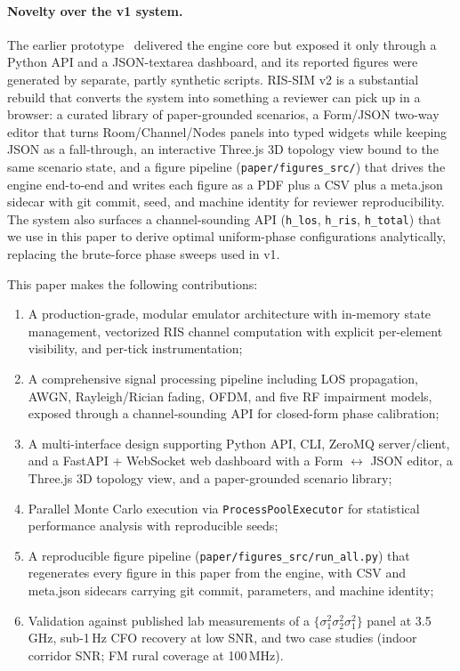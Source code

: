 \documentclass{article}
\begin{document}
\paragraph{Novelty over the v1 system.} The earlier prototype~\cite{WCL2025,NCC2025} delivered the engine core but exposed it only through a Python API and a JSON-textarea dashboard, and its reported figures were generated by separate, partly synthetic scripts. RIS-SIM v2 is a substantial rebuild that converts the system into something a reviewer can pick up in a browser: a curated library of paper-grounded scenarios, a Form/JSON two-way editor that turns Room/Channel/Nodes panels into typed widgets while keeping JSON as a fall-through, an interactive Three.js 3D topology view bound to the same scenario state, and a figure pipeline (\texttt{paper/figures\_src/}) that drives the engine end-to-end and writes each figure as a PDF plus a CSV plus a meta.json sidecar with git commit, seed, and machine identity for reviewer reproducibility. The system also surfaces a channel-sounding API (\texttt{h\_los}, \texttt{h\_ris}, \texttt{h\_total}) that we use in this paper to derive optimal uniform-phase configurations analytically, replacing the brute-force phase sweeps used in v1.

This paper makes the following contributions:
\begin{enumerate}
    \item A production-grade, modular emulator architecture with in-memory state management, vectorized RIS channel computation with explicit per-element visibility, and per-tick instrumentation;
    \item A comprehensive signal processing pipeline including LOS propagation, AWGN, Rayleigh/Rician fading, OFDM, and five RF impairment models, exposed through a channel-sounding API for closed-form phase calibration;
    \item A multi-interface design supporting Python API, CLI, ZeroMQ server/client, and a FastAPI + WebSocket web dashboard with a Form $\leftrightarrow$ JSON editor, a Three.js 3D topology view, and a paper-grounded scenario library;
    \item Parallel Monte Carlo execution via \texttt{ProcessPoolExecutor} for statistical performance analysis with reproducible seeds;
    \item A reproducible figure pipeline (\texttt{paper/figures\_src/run\_all.py}) that regenerates every figure in this paper from the engine, with CSV and meta.json sidecars carrying git commit, parameters, and machine identity;
    \item Validation against published lab measurements of a $\{\sigma_1^2\sigma_2^2\sigma_1^2\}$ panel at 3.5\,GHz, sub-1\,Hz CFO recovery at low SNR, and two case studies (indoor corridor SNR; FM rural coverage at 100\,MHz).
\end{enumerate}
\end{document}
